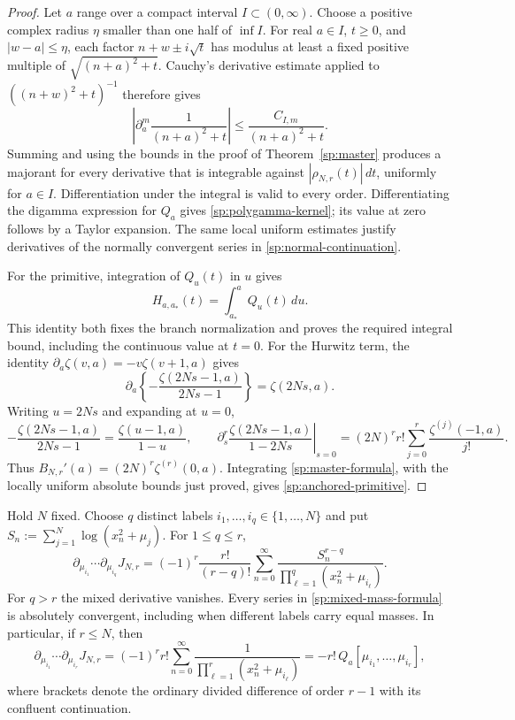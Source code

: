 \begin{proof}
Let $a$ range over a compact interval $I\subset(0,\infty)$.
Choose a positive complex radius $\eta$ smaller than one half of
$\inf I$.  For real $a\in I$, $t\geq0$, and $|w-a|\leq\eta$,
each factor $n+w\pm i\sqrt t$ has modulus at least a fixed
positive multiple of $\sqrt{(n+a)^2+t}$.  Cauchy's derivative
estimate applied to $((n+w)^2+t)^{-1}$ therefore gives
\[
 \left|\partial_a^m\frac{1}{(n+a)^2+t}\right|
 \leq\frac{C_{I,m}}{(n+a)^2+t}.
\]
Summing and using the bounds in the proof of
Theorem~\ref{sp:master} produces a majorant for every derivative
that is integrable against $|\rho_{N,r}(t)|\,dt$, uniformly for
$a\in I$.  Differentiation under the integral is valid to every
order.  Differentiating the digamma expression for $Q_a$ gives
\eqref{sp:polygamma-kernel}; its value at zero follows by a Taylor
expansion.  The same local uniform estimates justify derivatives
of the normally convergent series in
\eqref{sp:normal-continuation}.

For the primitive, integration of $Q_u(t)$ in $u$ gives
\[
 H_{a,a_*}(t)=\int_{a_*}^{a}Q_u(t)\,du.
\]
This identity both fixes the branch normalization and proves the
required integral bound, including the continuous value at $t=0$.
For the Hurwitz term, the identity
$\partial_a\zeta(v,a)=-v\zeta(v+1,a)$ gives
\[
 \partial_a\left\{-\frac{\zeta(2Ns-1,a)}{2Ns-1}\right\}
 =\zeta(2Ns,a).
\]
Writing $u=2Ns$ and expanding at $u=0$,
\[
 -\frac{\zeta(2Ns-1,a)}{2Ns-1}
 =\frac{\zeta(u-1,a)}{1-u},\qquad
 \left.\partial_s^r
    \frac{\zeta(2Ns-1,a)}{1-2Ns}\right|_{s=0}
 =(2N)^r r!\sum_{j=0}^{r}\frac{\zeta^{(j)}(-1,a)}{j!}.
\]
Thus $B_{N,r}'(a)=(2N)^r\zeta^{(r)}(0,a)$.
Integrating \eqref{sp:master-formula}, with the locally uniform
absolute bounds just proved, gives
\eqref{sp:anchored-primitive}.
\end{proof}

\begin{proposition}
\label{sp:mass-derivatives}
Hold $N$ fixed.  Choose $q$ distinct labels
$i_1,\ldots,i_q\in\{1,\ldots,N\}$ and put
$S_n:=\sum_{j=1}^{N}\log(x_n^2+\mu_j)$.
For $1\leq q\leq r$,
\begin{equation}
 \partial_{\mu_{i_1}}\cdots\partial_{\mu_{i_q}}J_{N,r}
 =(-1)^r\frac{r!}{(r-q)!}
   \sum_{n=0}^{\infty}
     \frac{S_n^{r-q}}{\prod_{\ell=1}^{q}(x_n^2+\mu_{i_\ell})}.
 \label{sp:mixed-mass-formula}
\end{equation}
For $q>r$ the mixed derivative vanishes.  Every series in
\eqref{sp:mixed-mass-formula} is absolutely convergent, including
when different labels carry equal masses.
In particular, if $r\leq N$, then
\begin{equation}
 \partial_{\mu_{i_1}}\cdots\partial_{\mu_{i_r}}J_{N,r}
 =(-1)^r r!\sum_{n=0}^{\infty}
          \frac{1}{\prod_{\ell=1}^{r}(x_n^2+\mu_{i_\ell})}
 =-r!\,Q_a[\mu_{i_1},\ldots,\mu_{i_r}],
 \label{sp:rational-mass-resolvent}
\end{equation}
where brackets denote the ordinary divided difference of order
$r-1$ with its confluent continuation.
\end{proposition}

